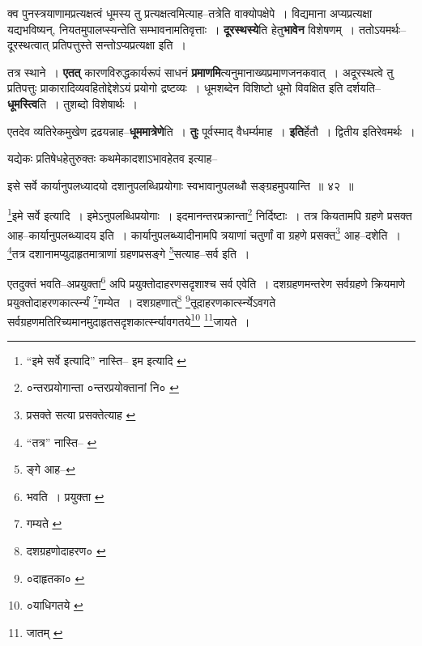 \documentclass[article,12pt,a4paper]{memoir}
\begin{document}
	  \pstart क्व पुनस्त्रयाणामप्रत्यक्षत्वं धूमस्य तु प्रत्यक्षत्वमित्याह--तत्रेति वाक्योपक्षेपे । विद्यमाना अप्यप्रत्यक्षा यद्यभविष्यन्, नियतमुपालप्स्यन्तेति सम्भावनामतिवृत्ताः । \textbf{दूरस्थस्ये}ति हेतु\textbf{भावेन} विशेषणम् । ततोऽयमर्थः--दूरस्थत्वात् प्रतिपत्तुस्ते सन्तोऽप्यप्रत्यक्षा इति ।
	\pend
      

	  \pstart तत्र स्थाने । \textbf{एतत्} कारणविरुद्धकार्यरूपं साधनं \textbf{प्रमाणमि}त्यनुमानाख्यप्रमाणजनकवात् । अदूरस्थत्वे तु प्रतिपत्तुः प्राकारादिव्यवहितोद्देशेऽयं प्रयोगो द्रष्टव्यः । धूमशब्देन विशिष्टो धूमो विवक्षित इति दर्शयति--\textbf{धूमस्त्वि}ति । तुशब्दो विशेषार्थः ।
	\pend
      

	  \pstart एतदेव व्यतिरेकमुखेण द्रढयन्नाह--\textbf{धूममात्रेणे}ति । \textbf{तुः} पूर्वस्माद् वैधर्म्यमाह । \textbf{इति}र्हेतौ । द्वितीय इतिरेवमर्थः ।
	\pend
	  \bigskip
	  \begingroup
	

	  \pstart यद्येकः प्रतिषेधहेतुरुक्तः कथमेकादशाऽभावहेतव इत्याह--
	\pend
       
	  \bigskip
	  \begingroup
	

	  \pstart इसे सर्वे कार्यानुपलध्यादयो दशानुपलब्धिप्रयोगाः स्वभावानुपलब्धौ सङ्ग्रहमुपयान्ति ॥ ४२ ॥
	\pend
      
	  \endgroup
	 

	  \pstart \footnote{“इमे सर्वे इत्यादि” नास्ति--\cite{dp-edH} \cite{dp-edN} इम इत्यादि \cite{dp-msA} \cite{dp-msB} \cite{dp-msD} \cite{dp-edE} \cite{dp-edP}}\-इमे सर्वे इत्यादि । इमेऽनुपलब्धिप्रयोगाः । इदमानन्तरप्रक्रान्ता\footnote{०न्तरप्रयोगान्ता \cite{dp-edH} \cite{dp-edE} ०न्तरप्रयोक्तानां नि० \cite{dp-msA}} निर्दिष्टाः । तत्र कियतामपि ग्रहणे प्रसक्त आह--कार्यानुपलब्ध्यादय इति । कार्यानुपलब्ध्यादीनामपि त्रयाणां चतुर्णां वा ग्रहणे प्रसक्त\footnote{प्रसक्ते सत्या \cite{dp-edP} \cite{dp-edH} \cite{dp-edE} \cite{dp-edN} प्रसक्तेत्याह \cite{dp-msA}} आह--दशेति । \footnote{“तत्र” नास्ति--\cite{dp-msA} \cite{dp-msB} \cite{dp-edP} \cite{dp-edH} \cite{dp-edE} \cite{dp-edN}}\-तत्र दशानामप्युदाहृतमात्राणां ग्रहणप्रसङ्गे \footnote{ङ्गे आह--\cite{dp-msB}}\-सत्याह--सर्व इति ।
	\pend
       

	  \pstart एतदुक्तं भवति--अप्रयुक्ता\footnote{भवति । प्रयुक्ता \cite{dp-msC}} अपि प्रयुक्तोदाहरणसदृशाश्च सर्व एवेति । दशग्रहणमन्तरेण सर्वग्रहणे क्रियमाणे प्रयुक्तोदाहरणकार्त्स्न्यं \footnote{गम्यते \cite{dp-msA} \cite{dp-msB} \cite{dp-msC} \cite{dp-msD} \cite{dp-edP} \cite{dp-edH} \cite{dp-edE} \cite{dp-edN}}\-गम्येत । दशग्रहणात्\footnote{दशग्रहणोदाहरण० \cite{dp-msB}} \footnote{०दाहृतका० \cite{dp-msC}}\-तूदाहरणकार्त्स्न्येऽवगते सर्वग्रहणमतिरिच्यमानमुदाहृतसदृशकार्त्स्न्यावगतये\footnote{०याधिगतये \cite{dp-msC}} \footnote{जातम् \cite{dp-edE}}\-जायते ।
	\pend
      
\end{document}
